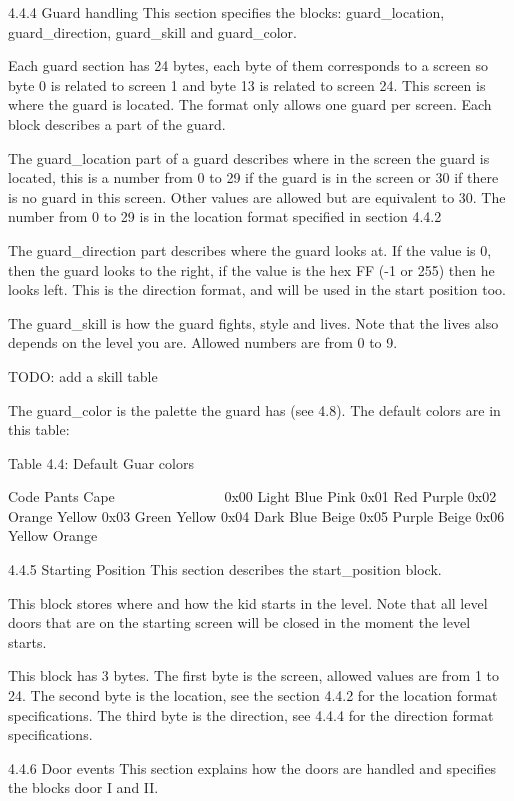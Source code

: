 4.4.4 Guard handling
 This section specifies the blocks: guard_location, guard_direction,
 guard_skill and guard_color.

 Each guard section has 24 bytes, each byte of them corresponds to a screen
 so byte 0 is related to screen 1 and byte 13 is related to screen 24.
 This screen is where the guard is located. The format only allows one
 guard per screen. Each block describes a part of the guard.

 The guard_location part of a guard describes where in the screen the guard
 is located, this is a number from 0 to 29 if the guard is in the screen or
 30 if there is no guard in this screen. Other values are allowed but are
 equivalent to 30. The number from 0 to 29 is in the location format
 specified in section 4.4.2

 The guard_direction part describes where the guard looks at. If the value
 is 0, then the guard looks to the right, if the value is the hex FF (-1 or
 255) then he looks left. This is the direction format, and will be used in
 the start position too.

 The guard_skill is how the guard fights, style and lives. Note that the
 lives also depends on the level you are. Allowed numbers are from 0 to 9.

 TODO: add a skill table

 The guard_color is the palette the guard has (see 4.8).
 The default colors are in this table:

                   Table 4.4: Default Guar colors
                   ~~~~~~~~~~~~~~~~~~~~~~~~~~~~~~

  Code Pants     Cape
  ~~~~ ~~~~~     ~~~~
  0x00 Light     Blue Pink
  0x01 Red       Purple
  0x02 Orange    Yellow
  0x03 Green     Yellow
  0x04 Dark Blue Beige
  0x05 Purple    Beige
  0x06 Yellow    Orange

4.4.5 Starting Position
 This section describes the start_position block.

 This block stores where and how the kid starts in the level. Note that all
 level doors that are on the starting screen will be closed in the moment
 the level starts.

 This block has 3 bytes.
 The first byte is the screen, allowed values are from 1 to 24.
 The second byte is the location, see the section 4.4.2 for the location
 format specifications.
 The third byte is the direction, see 4.4.4 for the direction format
 specifications.

4.4.6 Door events
 This section explains how the doors are handled and specifies the blocks
 door I and II.

